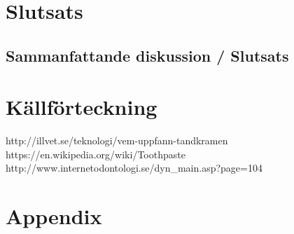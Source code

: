 \documentclass[12pt]{article}
\begin{document}
	\section{Slutsats}
		\subsection{Sammanfattande diskussion / Slutsats}

	\newpage
	\section{Källförteckning}
	http://illvet.se/teknologi/vem-uppfann-tandkramen\\
	https://en.wikipedia.org/wiki/Toothpaste\\
	http://www.internetodontologi.se/dyn\_main.asp?page=104\\
	\newpage
	\section{Appendix}
\end{document}
